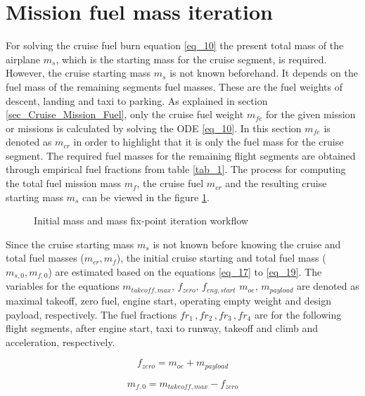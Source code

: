 
\section{Mission fuel mass iteration}
\label{sec_Fuel_Mass_iter}

For solving the cruise fuel burn equation \eqref{eq_10} 
the present total mass of the airplane $m_s$, which 
is the starting mass for the cruise segment, is required.
However, the cruise starting mass $m_s$ is not known beforehand.
It depends on the fuel mass of the remaining segments fuel masses. 
These are the fuel 
weights of descent, landing and taxi to parking. As explained 
in section \ref{sec_Cruise_Mission_Fuel}, only the 
cruise fuel weight $m_{fe}$ for
the given mission or missions is calculated by solving the ODE 
\eqref{eq_10}. In this section $m_{fe}$ is denoted as $m_{cr}$
in order to highlight that it is only the fuel mass for 
the cruise segment. The required fuel masses for the remaining
flight segments are obtained through empirical fuel fractions 
from table \ref{tab_1}. The process for computing the total fuel
mission mass 
$m_f$, the cruise fuel $m_{cr}$ and the resulting 
cruise starting mass $m_s$  can be viewed 
in the figure \ref{fig_4_Mass_Workflow}.\newline 
%
%
\begin{figure} [!h]
    \resizebox{\textwidth}{!}{
    
    }
    \caption{Initial mass and mass fix-point iteration workflow}
    \label{fig_4_Mass_Workflow}
\end{figure}
%
%

Since the cruise starting mass $m_s$ is not known 
before knowing the cruise and total fuel masses ($m_{cr}, m_{f}$), 
the initial cruise starting and total fuel mass ($m_{s,0}, m_{f,0}$)
are estimated based on the equations \eqref{eq_17} to 
\eqref{eq_19}. The variables for the equations 
$m_{takeoff,max},\, f_{zero},\, f_{eng,start}$
$m_{oe},\, m_{payload}$ are denoted 
as maximal takeoff, zero fuel, 
engine start, operating empty weight and design
payload, respectively. The fuel fractions 
$fr_1 \,, fr_2\,,fr_3 \,, fr_4$ are for the following 
flight segments, after engine start, taxi to runway, takeoff 
and climb and acceleration, respectively.

\begin{equation}
    \label{eq_17}
    f_{zero} = m_{oe} + m_{payload}
\end{equation}

\begin{equation}
    \label{eq_18}
    m_{f,0} = m_{takeoff,max} - f_{zero}
\end{equation}


